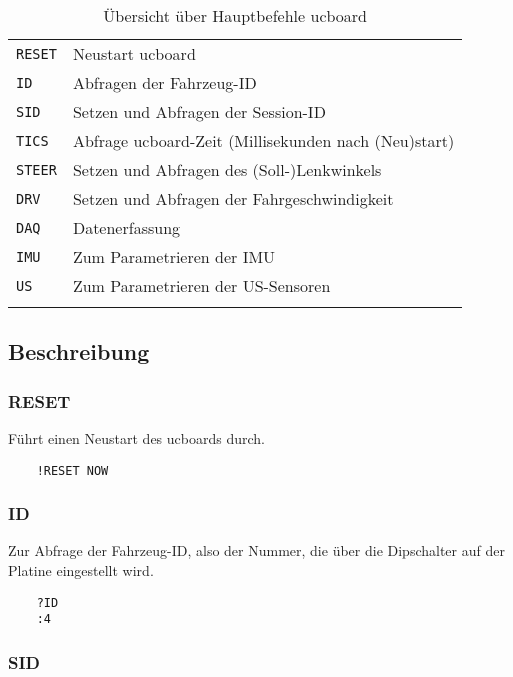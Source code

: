 \begin{table}[htbp]%
	\centering
	\caption{Übersicht über Hauptbefehle ucboard}
	\label{tab:Comm:Cmds}
	\begin{tabular}{ll}
		\mytoprule
		\verb|RESET| & Neustart ucboard \\
		\verb|ID|	& Abfragen der Fahrzeug-ID \\
		\verb|SID| & Setzen und Abfragen der Session-ID \\
		\verb|TICS| & Abfrage ucboard-Zeit (Millisekunden nach (Neu)start) \\
		\verb|STEER| & Setzen und Abfragen des (Soll-)Lenkwinkels \\
		\verb|DRV| & Setzen und Abfragen der Fahrgeschwindigkeit \\
		\verb|DAQ| & Datenerfassung \\
		\textcolor[rgb]{0.75,0.75,0.75}{\texttt{IMU}} & \textcolor[rgb]{0.75,0.75,0.75}{Zum Parametrieren der IMU} \\
		\textcolor[rgb]{0.75,0.75,0.75}{\texttt{US}} & \textcolor[rgb]{0.75,0.75,0.75}{Zum Parametrieren der US-Sensoren}\\
		\mybottomrule
	\end{tabular}
\end{table}


\subsection{Beschreibung}

\subsubsection{RESET}

Führt einen Neustart des ucboards durch.


\begin{verbatim}
	!RESET NOW
\end{verbatim}


\subsubsection{ID}

Zur Abfrage der Fahrzeug-ID, also der Nummer, die über die Dipschalter auf der Platine eingestellt wird.


\begin{verbatim}
	?ID
	:4
\end{verbatim}


\subsubsection{SID}

